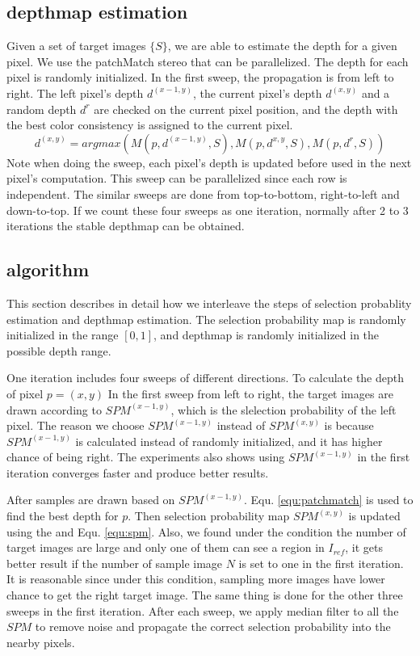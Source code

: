 \subsection{depthmap estimation}
Given a set of target images $\{S\}$, we are able to estimate the depth for a given pixel. We use the patchMatch stereo \cite{patchMatchStereo3} that can be parallelized.
The depth for each pixel is randomly initialized. In the first sweep, the propagation is from left to right. The left pixel's depth $d^{(x-1,y)}$, the current pixel's depth $d^{(x,y)}$ and a random depth $d^r$ are checked on the current pixel position, and the depth with the best color consistency is assigned to the current pixel.
\begin{equation}
    d^{(x,y)} = argmax( M(p,d^{(x-1, y)}, {S}), M(p,d^{x,y},{S}), M(p,d^r,{S}))   \label{equ:patchmatch}
\end{equation}
Note when doing the sweep, each pixel's depth is updated before used in the next pixel's computation. This sweep can be parallelized since each row is independent. The similar sweeps are done from top-to-bottom, right-to-left and down-to-top. If we count these four sweeps as one iteration, normally after 2 to 3 iterations the stable depthmap can be obtained.

\subsection{algorithm}
This section describes in detail how we interleave the steps of selection probablity estimation and depthmap estimation. The selection probability map is randomly initialized in the range $[0, 1]$, and depthmap is randomly initialized in the possible depth range.

One iteration includes four sweeps of different directions. To calculate the depth of pixel $p = (x, y)$ In the first sweep from left to right, the target images are drawn according to $SPM^{(x-1,y)}$, which is the slelection probability of the left pixel. The reason we choose $SPM^{(x-1,y)}$ instead of $SPM^(x,y)$ is because $SPM^(x-1,y)$ is calculated instead of randomly initialized, and it has higher chance of being right. The experiments also shows using $SPM^(x-1,y)$ in the first iteration converges faster and produce better results. 

After samples are drawn based on $SPM^(x-1,y)$. Equ. \ref{equ:patchmatch} is used to find the best depth  for $p$. Then selection probability map $SPM^{(x,y)}$ is updated using the  and Equ. \ref{equ:spm}. Also, we found under the condition the number of target images are large and only one of them can see a region in $I_{ref}$, it gets better result if the number of sample image $N$ is set to one in the first iteration. It is reasonable since under this condition, sampling more images have lower chance to get the right target image. The same thing is done for the other three sweeps in the first iteration. After each sweep, we apply median filter to all the $SPM$ to remove noise and propagate the correct selection probability into the nearby pixels.


